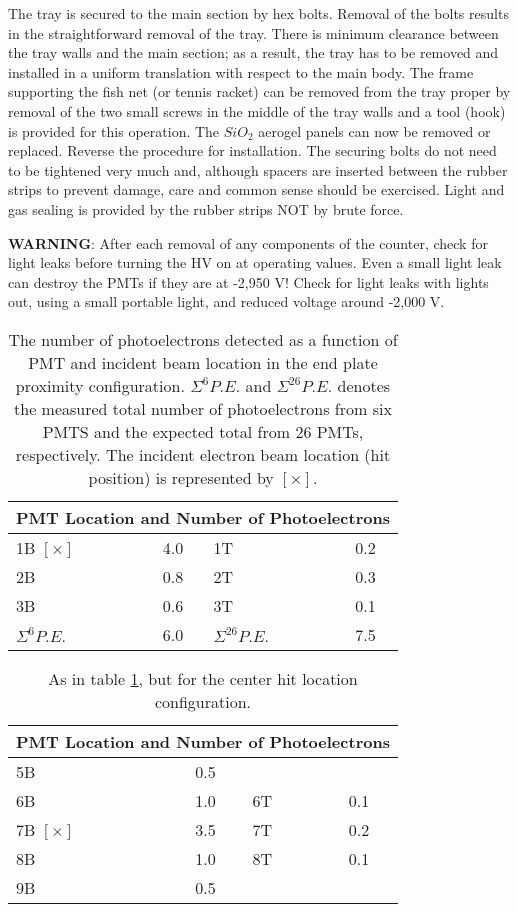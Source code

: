 The tray is secured to the main section by hex bolts. Removal of the bolts 
results in the straightforward removal of the tray. There is minimum clearance 
between the tray walls and the main section; as a result, the tray has to 
be removed and installed in a uniform translation with respect to the main 
body. The frame supporting the fish net (or tennis racket) can be removed from 
the tray proper by removal of the two small screws in the middle of the tray 
walls and a tool (hook) is provided for this operation. The $SiO_2$ aerogel 
panels can now be removed or replaced. Reverse the procedure for installation.
The securing bolts do not need to be tightened very much and, although spacers 
are inserted between the rubber strips to prevent damage, care and common sense 
 should be exercised. Light and gas sealing is provided by the 
rubber strips NOT by brute force.

{\bf WARNING}: After each removal of any components of the counter, check for light 
leaks before turning the HV on at operating values. Even a small light 
leak can destroy the PMTs if they are at -2,950 V! Check for light leaks with 
lights out, using a small portable light, and reduced voltage around -2,000 V.


\begin{table}
\caption{The number of photoelectrons detected as a function of PMT and 
incident beam location in the end plate proximity configuration.
$\Sigma^6 P.E.$ and $\Sigma^{26} P.E.$ denotes the measured total number of 
photoelectrons from six PMTS and the expected total from 26 PMTs, respectively. 
The incident electron beam location (hit position) is represented by
$[\times]$.} 
\begin{tabular}{lc|lc}
\multicolumn{4}{c}{PMT Location and Number of Photoelectrons}\\
\hline
1B $[\times]$ & 4.0 & 1T & 0.2 \\
2B            & 0.8 & 2T & 0.3 \\
3B            & 0.6 & 3T & 0.1 \\
\hline $\Sigma^6 P.E.$ & 6.0 & $\Sigma^{26} P.E.$ & 7.5\\
\end{tabular}
\label{tab:aero_tab1}
\end{table}

\begin{table}
\begin{tabular}{lc|lc}
\multicolumn{4}{c}{PMT Location and Number of Photoelectrons}\\
\hline
5B            & 0.5 & &  \\
6B            & 1.0 & 6T & 0.1 \\
7B $[\times]$ & 3.5 & 7T & 0.2 \\
8B            & 1.0 & 8T & 0.1 \\
9B            & 0.5 & & \\
\end{tabular}
\caption{As in table \ref{tab:aero_tab1}, but for the center hit location configuration.}
\label{tab:aero_tab2}
\end{table}




